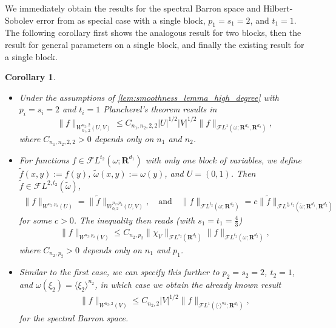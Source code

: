 \documentclass[a4paper]{article}
\newcommand{\rr}[1]{\mathbf{R}^{#1}}
\newcommand{\rrI}{\rr{d_1}}
\newcommand{\rrII}{\rr{d_2}}
\newcommand{\eabs}[1]{\langle #1\rangle}     %
\newcommand{\abs}[1]{| #1|}     %
\newcommand{\norm}[2]{\|#1\|_{#2}}
\newcommand{\F}[0]{\mathscr{F}}
\newcommand{\FL}[1]{\F L^{#1}}
\newcommand{\chF}[1]{\chi_{#1}}
\numberwithin{equation}{section}
\newtheorem{corollary}[theorem]{Corollary}
\theoremstyle{remark}
\begin{document}
We immediately obtain the results
for the spectral Barron space
and Hilbert-Sobolev error
from \cite[Lemma 2]{Siegel20ApproximationRatesNeural}
as special case with a single block, $p_1=s_1=2$, and $t_1=1$.
The following corollary first shows the analogous result for two blocks,
then the result for general parameters on a single block,
and finally the existing result for a single block.
\begin{corollary}
\begin{itemize}
\item
    Under the assumptions of \cref{lem:smoothness_lemma_high_degree}
    with $p_i=s_i=2$ and $t_i=1$
    Plancherel's theorem
    results in 
    \begin{equation*}
    	\norm{f}{W_{n_1,2}^{n_2, 2}(U, V)}
            \leq 
        C_{n_1,n_2,2,2}
        \abs{U}^{1/2}
        \abs{V}^{1/2}
        \norm{f}{\FL{1}(\omega;\rrI,\rrII)},
	\end{equation*}
    where $C_{n_1,n_2,2,2}>0$ depends only on $n_1$ and $n_2$.

    \item
    For functions \(f\in  \FL{t_2}(\omega;\rr{d_1})\) with only one block of variables,
    we define \(\tilde{f}(x,y):=f(y)\),
    \(\tilde{\omega}(x,y):=\omega(y)\), 
    and \(U=(0,1)\).
    Then \(\tilde{f}\in \FL{2,t_2}(\tilde{\omega})\),
    \begin{align*}
        \norm{f}{W^{n_2,p_2}(U)}
        =\norm{\tilde{f}}{W_{0,2}^{n_2,p_2}(U,V)},
        \quad\text{and}\quad
        \norm{f}{\FL{t_2}(\omega;\rrII)}
        =c \norm{\tilde{f}}{\FL{\frac{4}{3},t_2}(\tilde{\omega};\rrI,\rrII)}
    \end{align*}
    for some $c>0$.
    The inequality then reads
    (with $s_1=t_1=\frac{4}{3}$)
    \begin{align*}
    	\norm{f}{W^{n_2,p_2}(V)}
            \leq 
        C_{n_2,p_2}
        \norm{\chF{V}}{\FL{s_2}(\rrII)}
        \norm{f}{\FL{t_2}(\omega;\rrII)},
	\end{align*}
    where $C_{n_2, p_2}>0$ depends only on $n_1$ and $p_1$.

\item
    Similar to the first case, we can specify this further to $p_2=s_2=2$, $t_2=1$, and $\omega(\xi_2)=\eabs{\xi_2}^{n_2}$,
    in which case we obtain the already known result
    \begin{align*}
    	\norm{f}{W^{n_2,2}(V)}
            \leq 
        C_{n_2,2}
        \abs{V}^{1/2}
        \norm{f}{\FL{1}(\eabs{\cdot}^{n_2};\rrI)},
	\end{align*}
    for the spectral Barron space.
    \end{itemize}
\end{corollary}
\end{document}
